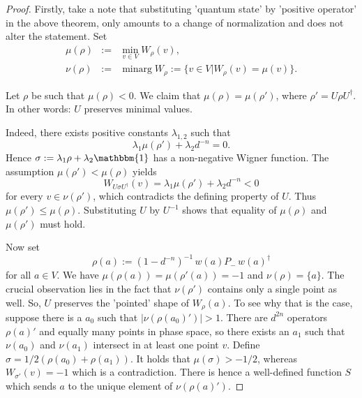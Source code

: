 \documentclass[aps,twocolumn,floatfix]{revtex4}
\def\Id{\mathbbm{1}}
\DeclareMathOperator{\minarg}{minarg}
\begin{document}
\begin{proof}
	Firstly, take a note that substituting 'quantum state' by 'positive
	operator' in the above theorem, only amounts to a change of
	normalization and does not alter the statement. 
	Set
	\begin{eqnarray*}
		\mu(\rho)&:=&\min_{v\in V} W_\rho(v),\\
		\nu(\rho)&:=&\minarg W_\rho := \{v\in V| W_\rho(v)=\mu(v)\}.
	\end{eqnarray*}

	Let $\rho$ be such that $\mu(\rho)<0$. We claim that
	$\mu(\rho)=\mu(\rho')$, where $\rho'=U\rho U^\dagger$. In other
	words: $U$ preserves minimal values.

	Indeed, there exists positive constants $\lambda_{1,2}$ such that 
	\begin{equation*}
		\lambda_1 \mu(\rho') + \lambda_2 d^{-n} = 0.
	\end{equation*}
	Hence $\sigma:=\lambda_1 \rho + \lambda_2 \Id$ has a non-negative Wigner
	function. The assumption $\mu(\rho')<\mu(\rho)$ yields
	\begin{equation*}
		W_{U\sigma U^\dagger}(v) = \lambda_1 \mu(\rho') + \lambda_2 d^{-n} < 0
	\end{equation*}
	for every $v\in \nu(\rho')$, which contradicts the defining property
	of $U$. Thus $\mu(\rho')\leq\mu(\rho)$. Substituting $U$ by $U^{-1}$
	shows that equality of $\mu(\rho)$ and $\mu(\rho')$ must hold.

	Now set 
	\begin{equation*}
		\rho(a):=(1-d^{-n})^{-1}\,w(a) P_-\,w(a)^\dagger
	\end{equation*}
	for all $a\in V$.
	We have $\mu(\rho(a))=\mu(\rho'(a))=-1$ and $\nu(\rho)=\{a\}$. The
	crucial observation lies in the fact that $\nu(\rho')$ contains only
	a single point as well. So, $U$ preserves the 'pointed' shape of
	$W_\rho(a)$. To see why that is the case, suppose there is a $a_0$
	such that $|\nu(\rho(a_0)')|>1$. There are $d^{2n}$ operators
	$\rho(a)'$ and equally many points in phase space, so there exists
	an $a_1$ such that $\nu(a_0)$ and $\nu(a_1)$ intersect in at least
	one point $v$. Define $\sigma=1/2(\rho(a_0)+\rho(a_1))$.  It holds
	that $\mu(\sigma)>-1/2$, whereas $W_{\sigma'}(v)=-1$ which is a
	contradiction.  There is hence a well-defined function $S$ which
	sends $a$ to the unique element of $\nu(\rho(a)')$.  
	

\end{proof}
\end{document}
